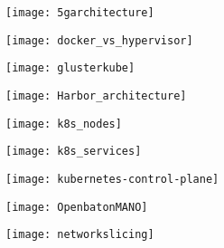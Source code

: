 \addtocounter{page}{-1}

\appendix

\begin{frame}[noframenumbering]
  \begin{figure}
    \centering
    \texttt{[image: 5garchitecture]}
  \end{figure}
\end{frame}

\begin{frame}[noframenumbering]
  \begin{figure}
    \centering
    \texttt{[image: docker\_vs\_hypervisor]}
  \end{figure}
\end{frame}

\begin{frame}[noframenumbering]
  \begin{figure}
    \centering
    \texttt{[image: glusterkube]}
  \end{figure}
\end{frame}

\begin{frame}[noframenumbering]
  \begin{figure}
    \centering
    \texttt{[image: Harbor\_architecture]}
  \end{figure}
\end{frame}

\begin{frame}[noframenumbering]
  \begin{figure}
    \centering
    \texttt{[image: k8s\_nodes]}
  \end{figure}
\end{frame}

\begin{frame}[noframenumbering]
  \begin{figure}
    \centering
    \texttt{[image: k8s\_services]}
  \end{figure}
\end{frame}

\begin{frame}[noframenumbering]
  \begin{figure}
    \centering
    \texttt{[image: kubernetes-control-plane]}
  \end{figure}
\end{frame}

\begin{frame}[noframenumbering]
  \begin{figure}
    \centering
    \texttt{[image: OpenbatonMANO]}
  \end{figure}
\end{frame}

\begin{frame}[noframenumbering]
  \begin{figure}
    \centering
    \texttt{[image: networkslicing]}
  \end{figure}
\end{frame}
